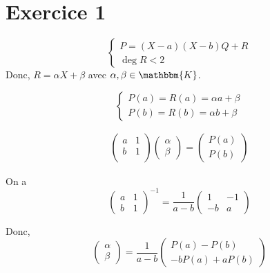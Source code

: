 \part{Exercice 1}

\[
	\begin{cases}
		P = (X-a)(X-b)Q + R\\
		\deg R < 2
	\end{cases}
\] 
Donc, $R = \alpha X + \beta$ avec $\alpha, \beta\in \mathbbm{K}$.

\[
	\begin{cases}
		P(a) = R(a) = \alpha a + \beta\\
		P(b) = R(b) = \alpha b + \beta
	\end{cases}
\]


\begin{align*}
	\begin{pmatrix}
		a&1\\
		b&1\\
	\end{pmatrix}\begin{pmatrix}
		\alpha\\
		\beta
	\end{pmatrix} = \begin{pmatrix}
		P(a)\\
		P(b)
	\end{pmatrix}
\end{align*}

On a \[
	\begin{pmatrix}
		a&1\\
		b&1
	\end{pmatrix}^{-1} = \frac{1}{a - b}
	\begin{pmatrix}
		1&-1\\
		-b&a
	\end{pmatrix}
\] 

Donc, \[
	\begin{pmatrix}
		\alpha\\
		\beta
	\end{pmatrix} = \frac{1}{a -b} \begin{pmatrix}
		P(a) - P(b)\\
		-bP(a) + aP(b)
	\end{pmatrix}
\]
